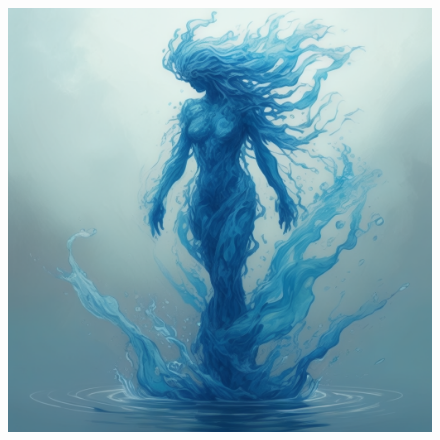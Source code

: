 
\begin{figure}[h]
\begin{center}
\includegraphics[scale=0.24]{img/ai-images/water-elemental.png}
\end{center}
\end{figure}
